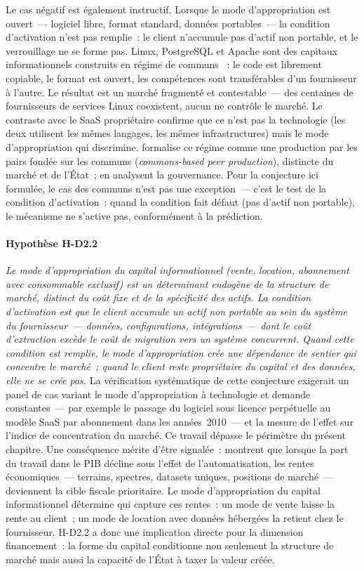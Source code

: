 Le cas négatif est également instructif. Lorsque le mode d'appropriation est ouvert~--- logiciel libre, format standard, données portables~--- la condition d'activation n'est pas remplie~: le client n'accumule pas d'actif non portable, et le verrouillage ne se forme pas. Linux, PostgreSQL et Apache sont des capitaux informationnels construits en régime de communs \parencite{benkler_wealth_2006,hess_understanding_2007}~: le code est librement copiable, le format est ouvert, les compétences sont transférables d'un fournisseur à l'autre. Le résultat est un marché fragmenté et contestable~--- des centaines de fournisseurs de services Linux coexistent, aucun ne contrôle le marché. Le contraste avec le SaaS propriétaire confirme que ce n'est pas la technologie (les deux utilisent les mêmes langages, les mêmes infrastructures) mais le mode d'appropriation qui discrimine. \textcite{benkler_wealth_2006} formalise ce régime comme une production par les pairs fondée sur les communs (\emph{commons-based peer production}), distincte du marché et de l'État~; \textcite{hess_understanding_2007} en analysent la gouvernance. Pour la conjecture ici formulée, le cas des communs n'est pas une exception~--- c'est le test de la condition d'activation~: quand la condition fait défaut (pas d'actif non portable), le mécanisme ne s'active pas, conformément à la prédiction.

\paragraph{Hypothèse H-D2.2} \emph{Le mode d'appropriation du capital informationnel (vente, location, abonnement avec consommable exclusif) est un déterminant endogène de la structure de marché, distinct du coût fixe et de la spécificité des actifs. La condition d'activation est que le client accumule un actif non portable au sein du système du fournisseur~--- données, configurations, intégrations~--- dont le coût d'extraction excède le coût de migration vers un système concurrent. Quand cette condition est remplie, le mode d'appropriation crée une dépendance de sentier qui concentre le marché~; quand le client reste propriétaire du capital et des données, elle ne se crée pas.} La vérification systématique de cette conjecture exigerait un panel de cas variant le mode d'appropriation à technologie et demande constantes~--- par exemple le passage du logiciel sous licence perpétuelle au modèle SaaS par abonnement dans les années~2010~--- et la mesure de l'effet sur l'indice de concentration du marché. Ce travail dépasse le périmètre du présent chapitre. Une conséquence mérite d'être signalée~: \textcite{korinek_lockwood_2025} montrent que lorsque la part du travail dans le PIB décline sous l'effet de l'automatisation, les rentes économiques~--- terrains, spectres, datasets uniques, positions de marché~--- deviennent la cible fiscale prioritaire. Le mode d'appropriation du capital informationnel détermine qui capture ces rentes~: un mode de vente laisse la rente au client~; un mode de location avec données hébergées la retient chez le fournisseur. H-D2.2 a donc une implication directe pour la dimension financement~: la forme du capital conditionne non seulement la structure de marché mais aussi la capacité de l'État à taxer la valeur créée.


